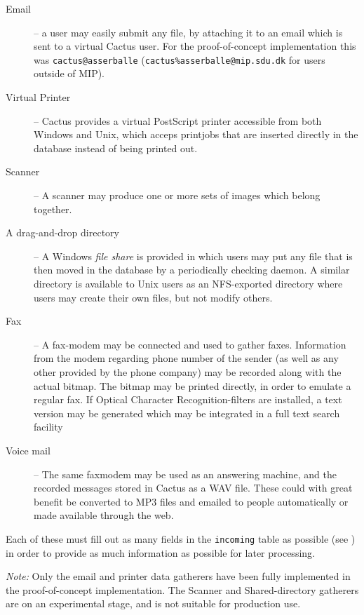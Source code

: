 \begin{description}
\item[Email] -- a user may easily submit any file, by
  attaching it to an email which is sent to a virtual Cactus
  user.  For the proof-of-concept implementation this was
  \texttt{cactus@asserballe}
  (\texttt{cactus\%asserballe@mip.sdu.dk} for users outside
  of MIP).

\item[Virtual Printer] -- Cactus provides a virtual
  PostScript printer accessible from both Windows and Unix,
  which acceps printjobs that are inserted directly in the
  database instead of being printed out.
  
\item[Scanner] -- A scanner may produce one or more sets of
  images which belong together.
  
\item[A drag-and-drop directory] -- A Windows \textit{file
    share} is provided in which users may put any file that
  is then moved in the database by a periodically checking
  daemon.  A similar directory is available to Unix users as
  an NFS-exported directory where users may create their own
  files, but not modify others.

  
\item[Fax] -- A fax-modem may be connected and used to
  gather faxes.  Information from the modem regarding phone
  number of the sender (as well as any other provided by the
  phone company) may be recorded along with the actual
  bitmap.  The bitmap may be printed directly, in order to
  emulate a regular fax.  If Optical Character
  Recognition-filters are installed, a text version may be
  generated which may be integrated in a full text search
  facility
  
\item[Voice mail] -- The same faxmodem may be used as an
  answering machine, and the recorded messages stored in
  Cactus as a WAV file.  These could with great benefit be
  converted to MP3 files and emailed to people automatically or made available through the web. 

\end{description}

Each of these must fill out as many fields in the
\texttt{incoming} table as possible (see
) in order to provide as much
information as possible for later processing.  

\textit{Note:} Only the email and printer data gatherers
have been fully implemented in the proof-of-concept
implementation.  The Scanner and Shared-directory gatherers
are on an experimental stage, and is not suitable for
production use.


